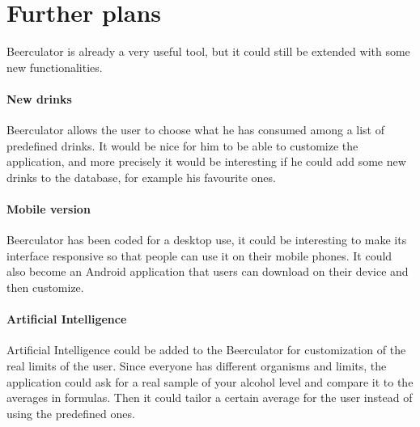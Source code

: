 \section{Further plans}
\label{sec:ideas}

Beerculator is already a very useful tool, but it could still be extended with some new functionalities. 

\paragraph{New drinks} Beerculator allows the user to choose what he has consumed among a list of predefined drinks. It would be nice for him to be able to customize the application, and more precisely it would be interesting if he could add some new drinks to the database, for example his favourite ones.
\paragraph{Mobile version} Beerculator has been coded for a desktop use, it could be interesting to make its interface responsive so that people can use it on their mobile phones. It could also become an Android application that users can download on their device and then customize.
\paragraph{Artificial Intelligence} Artificial Intelligence could be added to the Beerculator for customization of the real limits of the user. Since everyone has different organisms and limits, the application could ask for a real sample of your alcohol level and compare it to the averages in formulas. Then it could tailor a certain average for the user instead of using the predefined ones. 
